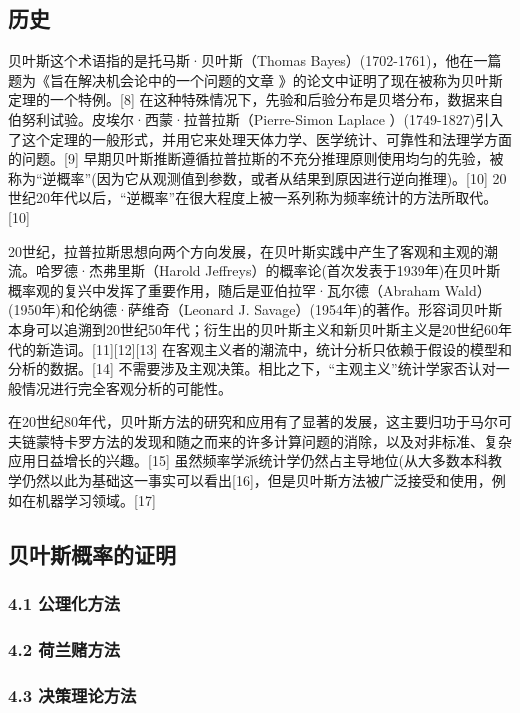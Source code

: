 \subsection{历史}

贝叶斯这个术语指的是托马斯·贝叶斯（Thomas Bayes）(1702-1761)，他在一篇题为《旨在解决机会论中的一个问题的文章 》的论文中证明了现在被称为贝叶斯定理的一个特例。[8] 在这种特殊情况下，先验和后验分布是贝塔分布，数据来自伯努利试验。皮埃尔·西蒙·拉普拉斯（Pierre-Simon Laplace ）(1749-1827)引入了这个定理的一般形式，并用它来处理天体力学、医学统计、可靠性和法理学方面的问题。[9] 早期贝叶斯推断遵循拉普拉斯的不充分推理原则使用均匀的先验，被称为“逆概率”(因为它从观测值到参数，或者从结果到原因进行逆向推理)。[10] 20世纪20年代以后，“逆概率”在很大程度上被一系列称为频率统计的方法所取代。[10]

20世纪，拉普拉斯思想向两个方向发展，在贝叶斯实践中产生了客观和主观的潮流。哈罗德·杰弗里斯（Harold Jeffreys）的概率论(首次发表于1939年)在贝叶斯概率观的复兴中发挥了重要作用，随后是亚伯拉罕·瓦尔德（Abraham Wald）(1950年)和伦纳德·萨维奇（Leonard J. Savage）(1954年)的著作。形容词贝叶斯本身可以追溯到20世纪50年代；衍生出的贝叶斯主义和新贝叶斯主义是20世纪60年代的新造词。[11][12][13] 在客观主义者的潮流中，统计分析只依赖于假设的模型和分析的数据。[14] 不需要涉及主观决策。相比之下，“主观主义”统计学家否认对一般情况进行完全客观分析的可能性。

在20世纪80年代，贝叶斯方法的研究和应用有了显著的发展，这主要归功于马尔可夫链蒙特卡罗方法的发现和随之而来的许多计算问题的消除，以及对非标准、复杂应用日益增长的兴趣。[15] 虽然频率学派统计学仍然占主导地位(从大多数本科教学仍然以此为基础这一事实可以看出[16]，但是贝叶斯方法被广泛接受和使用，例如在机器学习领域。[17]

\subsection{贝叶斯概率的证明}



\subsubsection{4.1 公理化方法}



\subsubsection{4.2 荷兰赌方法}



\subsubsection{4.3 决策理论方法}



